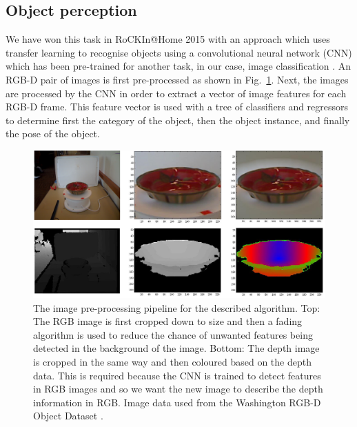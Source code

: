 \subsection{Object perception} 

We have won this task in RoCKIn@Home 2015 with an approach which uses transfer learning to recognise objects using a convolutional neural network (CNN) which has been pre-trained for another task, in our case, image classification \cite{schwarz}. An RGB-D pair of images is first pre-processed as shown in Fig.~\ref{fig:object_perception}. Next, the images are processed by the CNN in order to extract a vector of image features for each RGB-D frame. This feature vector is used with a tree of classifiers and regressors to determine first the category of the object, then the object instance, and finally the pose of the object.

\begin{figure}[!htb]
\centering
\includegraphics[width=3.in]{object_perception.png}
\caption{The image pre-processing pipeline for the described algorithm. Top: The RGB image is first cropped down to size and then a fading algorithm is used to reduce the chance of unwanted features being detected in the background of the image. Bottom: The depth image is cropped in the same way and then coloured based on the depth data. This is required because the CNN is trained to detect features in RGB images and so we want the new image to describe the depth information in RGB. Image data used from the Washington RGB-D Object Dataset \cite{lai}.}
\label{fig:object_perception}
\end{figure}



